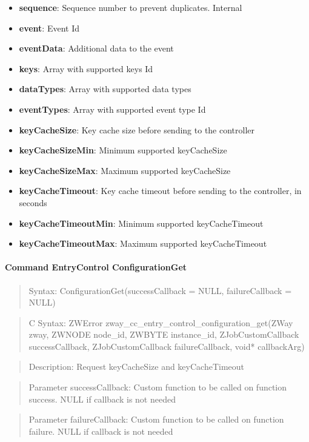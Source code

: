 \begin{itemize}
\item \textbf{sequence}: Sequence number to prevent duplicates. Internal
\item \textbf{event}: Event Id
\item \textbf{eventData}: Additional data to the event
\item \textbf{keys}: Array with supported keys Id
\item \textbf{dataTypes}: Array with supported data types
\item \textbf{eventTypes}: Array with supported event type Id
\item \textbf{keyCacheSize}: Key cache size before sending to the controller
\item \textbf{keyCacheSizeMin}: Minimum supported keyCacheSize
\item \textbf{keyCacheSizeMax}: Maximum supported keyCacheSize
\item \textbf{keyCacheTimeout}: Key cache timeout before sending to the controller, in seconds
\item \textbf{keyCacheTimeoutMin}: Minimum supported keyCacheTimeout
\item \textbf{keyCacheTimeoutMax}: Maximum supported keyCacheTimeout
\end{itemize}

\paragraph{Command EntryControl ConfigurationGet}
\begin{quote}Syntax: ConfigurationGet(successCallback = NULL, failureCallback = NULL)\end{quote}
\begin{quote}C Syntax: ZWError zway\_cc\_entry\_control\_configuration\_get(ZWay zway, ZWNODE node\_id, ZWBYTE instance\_id, ZJobCustomCallback successCallback, ZJobCustomCallback failureCallback, void* callbackArg)\end{quote}
\begin{quote}Description: Request keyCacheSize and keyCacheTimeout\end{quote}
\begin{quote}Parameter successCallback: Custom function to be called on function success. NULL if callback is not needed\end{quote}
\begin{quote}Parameter failureCallback: Custom function to be called on function failure. NULL if callback is not needed\end{quote}


